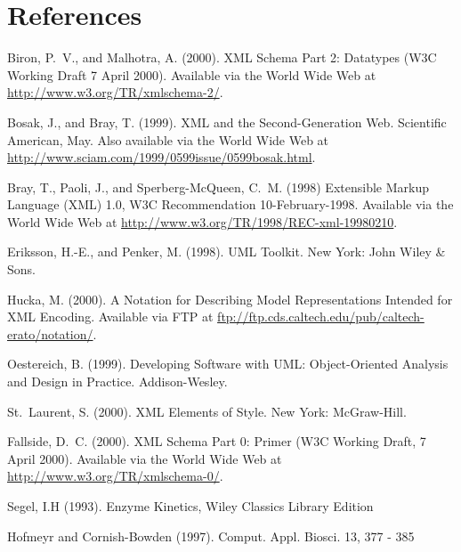 \documentclass[10pt]{cek-article}
\newcommand{\notationdocloc}{\url{ftp://ftp.cds.caltech.edu/pub/caltech-erato/notation/}}
\begin{document}
\setcounter{secnumdepth}{-1}
\section{References}

\setlength{\parskip}{1.2ex}

\begin{flushleft}

Biron, P.~V., and Malhotra, A.  (2000).  XML Schema Part 2: Datatypes (W3C
Working Draft 7 April 2000).  Available via the World Wide Web at
\url{http://www.w3.org/TR/xmlschema-2/}.

Bosak, J., and Bray, T. (1999).  {XML} and the Second-Generation Web.
Scientific American, May.  Also available via the World Wide Web at
\url{http://www.sciam.com/1999/0599issue/0599bosak.html}.

Bray, T., Paoli, J., and Sperberg-McQueen, C.~M. (1998) Extensible Markup
Language (XML) 1.0, W3C Recommendation 10-February-1998.  Available via the
World Wide Web at \url{http://www.w3.org/TR/1998/REC-xml-19980210}.

Eriksson, H.-E., and Penker, M. (1998).  UML Toolkit.  New York: John Wiley
\& Sons.

Hucka, M. (2000).  A Notation for Describing Model Representations Intended
for XML Encoding.  Available via FTP at \notationdocloc{}.

Oestereich, B.  (1999).  Developing Software with UML: Object-Oriented
Analysis and Design in Practice.  Addison-Wesley.

St.~Laurent, S. (2000).  XML Elements of Style.  New York: McGraw-Hill.

Fallside, D.~C.  (2000).  XML Schema Part 0: Primer (W3C Working Draft, 7
April 2000).  Available via the World Wide Web at
\url{http://www.w3.org/TR/xmlschema-0/}.

Segel, I.H (1993). Enzyme Kinetics, Wiley Classics Library Edition

Hofmeyr and Cornish-Bowden (1997). Comput. Appl. Biosci. 13, 377 - 385

\end{flushleft}

\end{document}
